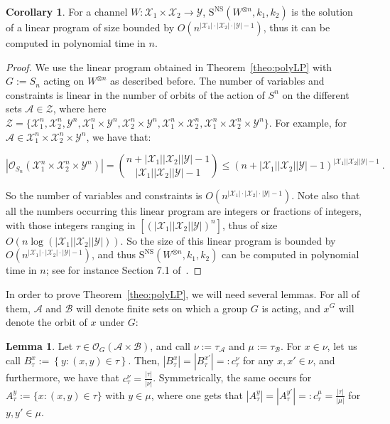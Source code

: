 \documentclass[11pt]{article}
\theoremstyle{definition}
\newtheorem{lem}[theo]{Lemma}
\newtheorem{cor}[theo]{Corollary}
\theoremstyle{remark}
\begin{document}
\begin{cor}
  For a channel $W : \mathcal{X}_1 \times \mathcal{X}_2 \to \mathcal{Y}$, $\mathrm{S}^{\mathrm{NS}}(W^{\otimes n},k_1,k_2)$ is the solution of a linear program of size bounded by $O\left(n^{|\mathcal{X}_1|\cdot|\mathcal{X}_2 |\cdot|\mathcal{Y}|-1}\right)$, thus it can be computed in polynomial time in $n$.
  \label{cor:poly}
\end{cor}
\begin{proof}
  We use the linear program obtained in Theorem~\ref{theo:polyLP} with $G:=S_n$ acting on $W^{\otimes n}$ as described before. 
  The number of variables and constraints is linear in the number of orbits of the action of $S^n$ on the different sets $\mathcal{A} \in \mathcal{Z}$, where here $\mathcal{Z} = \{\mathcal{X}_1^n, \mathcal{X}_2^n, \mathcal{Y}^n, \mathcal{X}^n_1 \times \mathcal{Y}^n, \mathcal{X}^n_2 \times \mathcal{Y}^n, \mathcal{X}^n_1 \times \mathcal{X}^n_2,  \mathcal{X}^n_1 \times \mathcal{X}^n_2 \times \mathcal{Y}^n \}$. For example, for $\mathcal{A} \in \mathcal{X}^n_1 \times \mathcal{X}^n_2 \times \mathcal{Y}^n$, we have that:

\[ |\mathcal{O}_{S_n}(\mathcal{X}^n_1 \times \mathcal{X}^n_2 \times \mathcal{Y}^n)| = \binom{n + |\mathcal{X}_1||\mathcal{X}_2| |\mathcal{Y}|   - 1}{|\mathcal{X}_1| |\mathcal{X}_2| |\mathcal{Y}| - 1} \leq (n+|\mathcal{X}_1||\mathcal{X}_2| |\mathcal{Y}|-1)^{|\mathcal{X}_1||\mathcal{X}_2| |\mathcal{Y}| - 1} \ .\]

So the number of variables and constraints is $O(n^{|\mathcal{X}_1|\cdot|\mathcal{X}_2 |\cdot|\mathcal{Y}|-1})$. Note also that all the numbers occurring this linear program are integers or fractions of integers, with those integers ranging in $\left[\left(|\mathcal{X}_1||\mathcal{X}_2||\mathcal{Y}|\right)^n\right]$, thus of size $O(n\log(|\mathcal{X}_1||\mathcal{X}_2||\mathcal{Y}|))$. So the size of this linear program is bounded by $O(n^{|\mathcal{X}_1|\cdot|\mathcal{X}_2 |\cdot|\mathcal{Y}|-1})$, and thus $\mathrm{S}^{\mathrm{NS}}(W^{\otimes n},k_1,k_2)$ can be computed in polynomial time in $n$; see for instance Section 7.1 of~\cite{LinearProgramming}.
\end{proof}

In order to prove Theorem~\ref{theo:polyLP}, we will need several lemmas. For all of them, $\mathcal{A}$ and $\mathcal{B}$ will denote finite sets on which a group $G$ is acting, and $x^G$ will denote the orbit of $x$ under $G$:

\begin{lem}
  \label{lem:orbitProjCard}
  Let $\tau \in \mathcal{O}_G(\mathcal{A} \times \mathcal{B})$, and call $\nu := \tau_{\mathcal{A}}$ and $\mu := \tau_{\mathcal{B}}$. For $x \in \nu$, let us call $B_{\tau}^x := \left\{y:(x,y)\in\tau\right\}$. Then, $|B_{\tau}^x|=|B_{\tau}^{x'}|=:c_{\tau}^{\nu}$ for any $x,x' \in \nu$, and furthermore, we have that $c_{\tau}^{\nu}=\frac{|\tau|}{|\nu|}$. Symmetrically, the same occurs for $A_{\tau}^y := \{x:(x,y)\in\tau\}$ with $y \in \mu$, where one gets that $|A_{\tau}^y|=|A_{\tau}^{y'}|=:c_{\tau}^{\mu}=\frac{|\tau|}{|\mu|}$ for $y,y' \in \mu$.
\end{lem}
\end{document}

